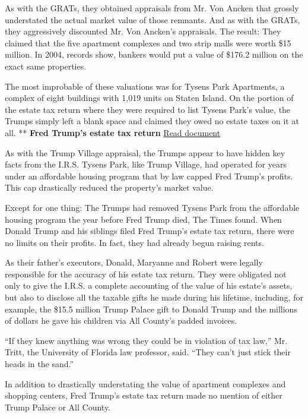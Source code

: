 As with the GRATs, they obtained appraisals from Mr. Von Ancken that
grossly understated the actual market value of those remnants. And as
with the GRATs, they aggressively discounted Mr. Von Ancken's
appraisals. The result: They claimed that the five apartment complexes
and two strip malls were worth \$15 million. In 2004, records show,
bankers would put a value of \$176.2 million on the exact same
properties.

The most improbable of these valuations was for Tysens Park Apartments,
a complex of eight buildings with 1,019 units on Staten Island. On the
portion of the estate tax return where they were required to list Tysens
Park's value, the Trumps simply left a blank space and claimed they owed
no estate taxes on it at all. ** \textbf{Fred Trump's estate tax return}
\href{https://int.graylady3jvrrxbe.onion/data/documenthelper/209-fct-federal-estate-tax-return/37760d2a7b28b983e8ce/optimized/full.pdf\#page=1}{Read
document}

As with the Trump Village appraisal, the Trumps appear to have hidden
key facts from the I.R.S. Tysens Park, like Trump Village, had operated
for years under an affordable housing program that by law capped Fred
Trump's profits. This cap drastically reduced the property's market
value.

Except for one thing: The Trumps had removed Tysens Park from the
affordable housing program the year before Fred Trump died, The Times
found. When Donald Trump and his siblings filed Fred Trump's estate tax
return, there were no limits on their profits. In fact, they had already
begun raising rents.

As their father's executors, Donald, Maryanne and Robert were legally
responsible for the accuracy of his estate tax return. They were
obligated not only to give the I.R.S. a complete accounting of the value
of his estate's assets, but also to disclose all the taxable gifts he
made during his lifetime, including, for example, the \$15.5 million
Trump Palace gift to Donald Trump and the millions of dollars he gave
his children via All County's padded invoices.

``If they knew anything was wrong they could be in violation of tax
law,'' Mr. Tritt, the University of Florida law professor, said. ``They
can't just stick their heads in the sand.''

In addition to drastically understating the value of apartment complexes
and shopping centers, Fred Trump's estate tax return made no mention of
either Trump Palace or All County.


